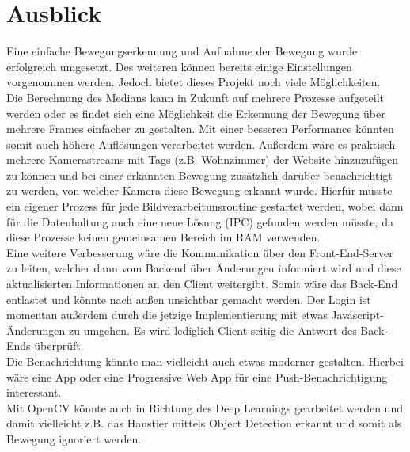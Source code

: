 \chapter{Ausblick}
Eine einfache Bewegungserkennung und Aufnahme der Bewegung wurde erfolgreich umgesetzt. Des weiteren können bereits einige Einstellungen vorgenommen werden. Jedoch bietet dieses Projekt noch viele Möglichkeiten.\\
Die Berechnung des Medians kann in Zukunft auf mehrere Prozesse aufgeteilt werden oder es findet sich eine Möglichkeit die Erkennung der Bewegung über mehrere Frames einfacher zu gestalten.
Mit einer besseren Performance könnten somit auch höhere Auflösungen verarbeitet werden.
Außerdem wäre es praktisch mehrere Kamerastreams mit Tags (z.B. Wohnzimmer) der Website hinzuzufügen zu können und bei einer erkannten Bewegung zusätzlich darüber benachrichtigt zu werden, von welcher Kamera diese Bewegung erkannt wurde. Hierfür müsste ein eigener Prozess für jede Bildverarbeitunsroutine gestartet werden, wobei dann für die Datenhaltung auch eine neue Lösung (IPC) gefunden werden müsste, da diese Prozesse keinen gemeinsamen Bereich im RAM verwenden.\\
Eine weitere Verbesserung wäre die Kommunikation über den Front-End-Server zu leiten, welcher dann vom Backend über Änderungen informiert wird und diese aktualisierten Informationen an den Client weitergibt. Somit wäre das Back-End entlastet und könnte nach außen unsichtbar gemacht werden. Der Login ist momentan außerdem durch die jetzige Implementierung mit etwas Javascript-Änderungen zu umgehen. Es wird lediglich Client-seitig die Antwort des Back-Ends überprüft.\\
Die Benachrichtung könnte man vielleicht auch etwas moderner gestalten. Hierbei wäre eine App oder eine Progressive Web App für eine Push-Benachrichtigung interessant.\\
Mit OpenCV könnte auch in Richtung des Deep Learnings gearbeitet werden und damit vielleicht z.B. das Haustier mittels Object Detection erkannt und somit als Bewegung ignoriert werden.